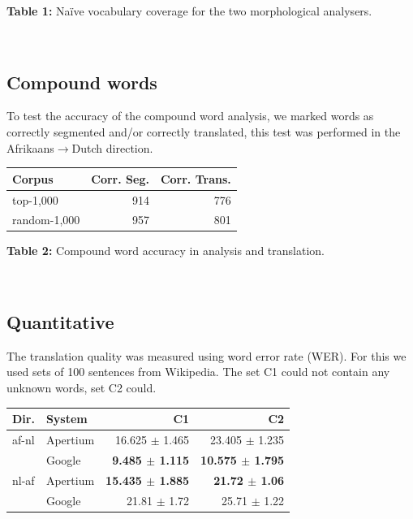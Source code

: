 \documentclass[a0,landscape]{a0poster}
\begin{document}
\begin{multicols}{4}
\begin{minipage}[b]{25cm}
\begin{center}
 \end{center}
 \textbf{Table 1:} Na\"ive vocabulary coverage for the two morphological analysers.
\end{minipage}\\

\subsection{Compound words}
\noindent
To test the accuracy of the compound word analysis, we marked words as correctly segmented and/or 
correctly translated, this test was performed in the Afrikaans$\rightarrow$Dutch direction. \\

\begin{minipage}[b]{25cm}
  \begin{center}
  \begin{tabular}{|l|r|r|}
   \hline
   {\bf Corpus}    & {\bf Corr. Seg.}    & {\bf Corr. Trans.}\\
   \hline
   top-1,000       & 914                 &  776 \\ 
   \hline
   random-1,000    & 957                 &  801 \\ 
   \hline
  \end{tabular}
  \end{center}
  \textbf{Table 2:} Compound word accuracy in analysis and translation.
\end{minipage}\\

\subsection{Quantitative}  
\noindent
The translation quality was measured using word error rate (WER). For this we used sets
of 100 sentences from Wikipedia. The set C1 could not contain any unknown words, set C2 could. \\ 
\begin{minipage}[b]{25cm}
\begin{center}
  \begin{tabular}{|l|l|r|r|}
   \hline
   {\bf Dir.} & {\bf System}             & {\bf C1}          & {\bf C2} \\ 
   \hline
   {af-nl}  & {\small Apertium}  & 16.625 $\pm$ 1.465 & 23.405 $\pm$ 1.235 \\
            & {\small Google}  & {\bf 9.485 $\pm$ 1.115} & {\bf 10.575 $\pm$ 1.795} \\
   \hline
   {nl-af} & {\small Apertium }  & {\bf 15.435 $\pm$ 1.885}  & {\bf 21.72 $\pm$ 1.06} \\
           & {\small Google }  & 21.81 $\pm$ 1.72& 	25.71 $\pm$ 1.22	\\


\end{tabular}
\end{center}
\end{minipage}
\end{multicols}
\end{document}
